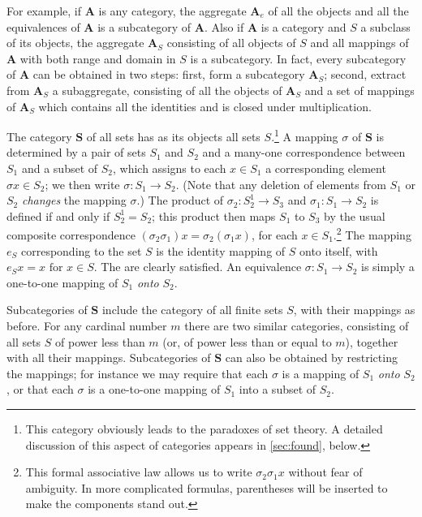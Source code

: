 \documentclass[11pt,a4paper]{report}
\begin{document}
For example, if $\mathbf{A}$ is any category, the aggregate $\mathbf{A}_e$ of all the objects and all the equivalences
of $\mathbf{A}$ is a subcategory of $\mathbf{A}$. Also if  $\mathbf{A}$ is a category and $S$ a subclass of its objects,
the aggregate $\mathbf{A}_S$ consisting of all objects of $S$ and all mappings of $\mathbf{A}$ with both range and domain
in $S$ is a subcategory. In fact, every subcategory of $\mathbf{A}$  can be obtained in two steps: first, form a 
subcategory $\mathbf{A}_S$; second, extract from $\mathbf{A}_S$ a subaggregate, consisting of all the objects of 
$\mathbf{A}_S$ and a set of mappings of $\mathbf{A}_S$ which contains all the identities and is closed under multiplication.

The category $\mathbf{S}$ of all sets has as its objects all sets $S$.\footnote{This category obviously leads to the
paradoxes of set theory. A detailed discussion of this aspect of categories appears in \cref{sec:found}, below.}
A mapping $\sigma$ of $\mathbf{S}$ is determined by a pair of sets $S_1$ and $S_2$ and a many\hyp{}one correspondence between
$S_1$ and a subset of $S_2$, which assigns to each $x\in S_1$ a corresponding element $\sigma x\in S_2$; we then write
$\sigma : S_1\rightarrow S_2$. (Note that any deletion of elements from $S_1$ or $S_2$ \emph{changes} the mapping $\sigma$.)
The product of $\sigma_2: S_2^1\rightarrow S_3$ and $\sigma_1: S_1\rightarrow S_2$ is defined if and only if $S^1_2=S_2$;
this product then maps $S_1$ to $S_3$ by the usual composite correspondence $(\sigma_2\sigma_1)x=\sigma_2(\sigma_1 x)$,
for each $x\in S_1$.\footnote{This formal associative law allows us to write $\sigma_2\sigma_1 x$ without fear of ambiguity.
In more complicated formulas, parentheses will be inserted to make the components stand out.} The mapping $e_S$ corresponding
to the set $S$ is the identity mapping of $S$ onto itself, with $e_S x=x\text{ for }x\in S$. The 
are clearly satisfied. An equivalence $\sigma:S_1\rightarrow S_2$ is simply a one\hyp{}to\hyp{}one mapping of $S_1$ \emph{onto} $S_2$.

Subcategories of $\mathbf{S}$ include the category of all finite sets $S$, with their mappings as before. For any cardinal
number $m$ there are two similar categories, consisting of all sets $S$ of power less than $m$ (or, of power less than or 
equal to $m$), together with all their mappings. Subcategories of $\mathbf{S}$ can also be obtained by restricting the
mappings; for instance we may require that each $\sigma$ is a mapping of $S_1$ \emph{onto} $S_2$, or that each $\sigma$ is a
one\hyp{}to\hyp{}one mapping of $S_1$ into a subset of $S_2$.
\end{document}
